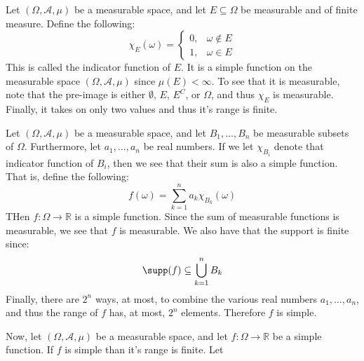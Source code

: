     \begin{lexample}
        Let $(\Omega,\mathcal{A},\mu)$ be a measurable
        space, and let $E\subseteq\Omega$ be measurable
        and of finite measure. Define the following:
        \begin{equation}
            \chi_{E}(\omega)=
            \begin{cases}
                0,&\omega\notin{E}\\
                1,&\omega\in{E}
            \end{cases}
        \end{equation}
        This is called the indicator function of
        $E$. It is a simple function on the measurable
        space $(\Omega,\mathcal{A},\mu)$ since
        $\mu(E)<\infty$. To see that it is measurable,
        note that the pre-image is either
        $\emptyset$, $E$, $E^{C}$, or $\Omega$, and thus
        $\chi_{E}$ is measurable. Finally, it takes on
        only two values and thus it's range is finite.
    \end{lexample}
    \begin{lexample}
        Let $(\Omega,\mathcal{A},\mu)$ be a measurable
        space, and let $B_{1},\dots,B_{n}$ be measurable
        subsets of $\Omega$. Furthermore, let
        $a_{1},\dots,a_{n}$ be real numbers. If we let
        $\chi_{B_{i}}$ denote that indicator
        function of $B_{i}$, then we see that their sum
        is also a simple function. That is, define the
        following:
        \begin{equation}
            f(\omega)=\sum_{k=1}^{n}
                a_{k}\chi_{B_{k}}(\omega)
        \end{equation}
        THen $f:\Omega\rightarrow\mathbb{R}$ is a simple
        function. Since the sum of measurable functions
        is measurable, we see that $f$ is measurable.
        We also have that the support is finite since:
        \begin{equation}
            \supp(f)\subseteq\bigcup_{k=1}^{n}B_{k}
        \end{equation}
        Finally, there are $2^{n}$ ways, at most, to
        combine the various real numbers
        $a_{1},\dots,a_{n}$, and thus the range of
        $f$ has, at most, $2^{n}$ elements. Therefore
        $f$ is simple.
    \end{lexample}
    Now, let $(\Omega,\mathcal{A},\mu)$ be a
    measurable space, and let
    $f:\Omega\rightarrow\mathbb{R}$ be a simple function.
    If $f$ is simple than it's range is finite. Let
